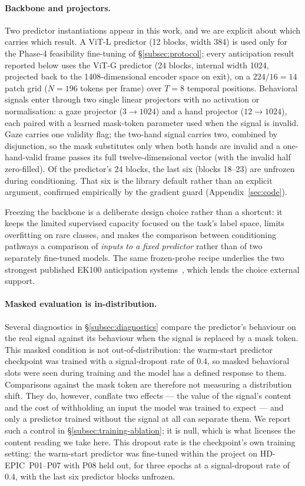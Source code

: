 \paragraph{Backbone and projectors.}
Two predictor instantiations appear in this work, and we are explicit about which
carries which result. A ViT-L predictor (12 blocks, width 384) is used only for
the Phase-4 feasibility fine-tuning of \S\ref{subsec:protocol}; every
anticipation result reported below uses the ViT-G predictor (24 blocks, internal width
1024, projected back to the 1408-dimensional encoder space on exit), on a $224/16 = 14$ patch grid ($N = 196$ tokens per frame) over
$T = 8$ temporal positions. Behavioral signals enter through two single linear
projectors with no activation or normalisation: a gaze projector
($3\rightarrow1024$) and a hand projector ($12\rightarrow1024$), each paired with
a learned mask-token parameter used when the signal is invalid. Gaze carries one
validity flag; the two-hand signal carries two, combined by disjunction, so the
mask substitutes only when both hands are invalid and a one-hand-valid frame
passes its full twelve-dimensional vector (with the invalid half zero-filled).
Of the predictor's 24 blocks, the last six (blocks 18--23) are unfrozen during
conditioning. That six is the library default rather than an explicit argument,
confirmed empirically by the gradient guard (Appendix~\ref{sec:code}).

Freezing the backbone is a deliberate design choice rather than a shortcut: it
keeps the limited supervised capacity focused on the task's label space, limits
overfitting on rare classes, and makes the comparison between conditioning
pathways a comparison of \emph{inputs to a fixed predictor} rather than of two
separately fine-tuned models. The same frozen-probe recipe underlies the two
strongest published EK100 anticipation systems~\citep{chu2026jfaa,
wang2026tapjepa}, which lends the choice external support.

\paragraph{Masked evaluation is in-distribution.}
Several diagnostics in \S\ref{subsec:diagnostics} compare the predictor's
behaviour on the real signal against its behaviour when the signal is replaced
by a mask token. This masked condition is not out-of-distribution: the warm-start
predictor checkpoint was trained with a signal-dropout rate of $0.4$, so masked
behavioral slots were seen during training and the model has a defined response
to them. Comparisons against the mask token are therefore not measuring a distribution
shift. They do, however, conflate two effects --- the value of the signal's
content and the cost of withholding an input the model was trained to expect ---
and only a predictor trained without the signal at all can separate them. We report such a control in \S\ref{subsec:training-ablation}; it is null, which is what licenses
the content reading we take here. This dropout rate is the checkpoint's own training
setting: the warm-start predictor was fine-tuned within the project on
HD-EPIC~P01--P07 with P08 held out, for three epochs at a signal-dropout rate of
$0.4$, with the last six predictor blocks unfrozen.

